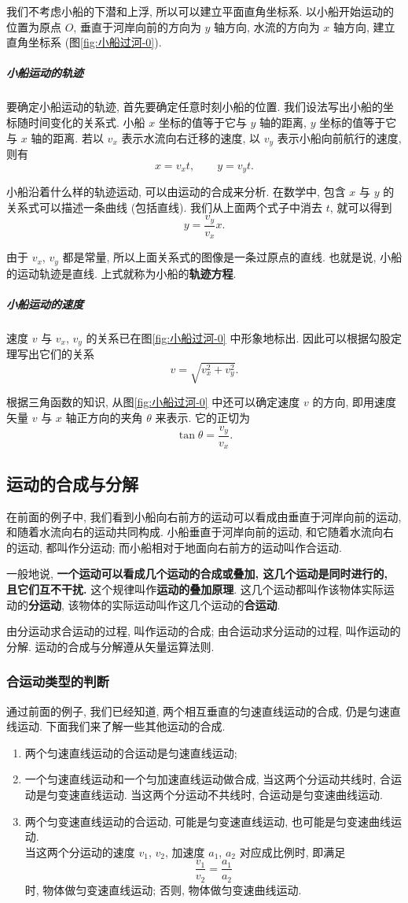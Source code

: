 \documentclass[UTF8,openany,fontset=fandol]{ctexbook}
\theoremstyle{chinesetextbook}
\begin{document}
我们不考虑小船的下潜和上浮, 所以可以建立平面直角坐标系. 以小船开始运动的位置为原点 $O$, 垂直于河岸向前的方向为 $y$ 轴方向, 水流的方向为 $x$ 轴方向, 建立直角坐标系 (图\ref{fig:小船过河-0}).

\subparagraph{小船运动的轨迹} 要确定小船运动的轨迹, 首先要确定任意时刻小船的位置. 我们设法写出小船的坐标随时间变化的关系式. 小船 $x$ 坐标的值等于它与 $y$ 轴的距离, $y$ 坐标的值等于它与 $x$ 轴的距离. 若以 $v_x$ 表示水流向右迁移的速度, 以 $v_y$ 表示小船向前航行的速度, 则有
\[
x=v_xt,\qquad y=v_yt.
\]

小船沿着什么样的轨迹运动, 可以由运动的合成来分析. 在数学中, 包含 $x$ 与 $y$ 的关系式可以描述一条曲线 (包括直线). 我们从上面两个式子中消去 $t$, 就可以得到
\[
y=\frac{v_y}{v_x}x.
\]

由于 $v_x$, $v_y$ 都是常量, 所以上面关系式的图像是一条过原点的直线. 也就是说, 小船的运动轨迹是直线. 上式就称为小船的\textbf{轨迹方程}.

\subparagraph{小船运动的速度} 速度 $v$ 与 $v_x$, $v_y$ 的关系已在图\ref{fig:小船过河-0} 中形象地标出. 因此可以根据勾股定理写出它们的关系
\[
v=\sqrt{v_x^2+v_y^2}.
\]

根据三角函数的知识, 从图\ref{fig:小船过河-0} 中还可以确定速度 $v$ 的方向, 即用速度矢量 $v$ 与 $x$ 轴正方向的夹角 $\theta$ 来表示. 它的正切为
\[
\tan\theta=\frac{v_y}{v_x}.
\]
\subsection*{运动的合成与分解}
在前面的例子中, 我们看到小船向右前方的运动可以看成由垂直于河岸向前的运动, 和随着水流向右的运动共同构成. 小船垂直于河岸向前的运动, 和它随着水流向右的运动, 都叫作分运动; 而小船相对于地面向右前方的运动叫作合运动.

一般地说, \textbf{一个运动可以看成几个运动的合成或叠加, 这几个运动是同时进行的, 且它们互不干扰.} 这个规律叫作\textbf{运动的叠加原理}. 这几个运动都叫作该物体实际运动的\textbf{分运动}, 该物体的实际运动叫作这几个运动的\textbf{合运动}.

由分运动求合运动的过程, 叫作运动的合成; 由合运动求分运动的过程, 叫作运动的分解. 运动的合成与分解遵从矢量运算法则.
\subsubsection{合运动类型的判断}
通过前面的例子, 我们已经知道, 两个相互垂直的匀速直线运动的合成, 仍是匀速直线运动. 下面我们来了解一些其他运动的合成.
\begin{enumerate}
\item 两个匀速直线运动的合运动是匀速直线运动;
\item 一个匀速直线运动和一个匀加速直线运动做合成, 当这两个分运动共线时, 合运动是匀变速直线运动. 当这两个分运动不共线时, 合运动是匀变速曲线运动.
\item 两个匀变速直线运动的合运动, 可能是匀变速直线运动, 也可能是匀变速曲线运动.\\ 当这两个分运动的速度 $v_1$, $v_2$, 加速度 $a_1$, $a_2$ 对应成比例时, 即满足
\[
\frac{v_1}{v_2}=\frac{a_1}{a_2}
\]
时, 物体做匀变速直线运动; 否则, 物体做匀变速曲线运动.
\end{enumerate}
\end{document}
